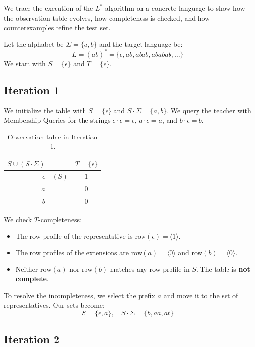We trace the execution of the $L^*$ algorithm on a concrete language to show how the observation table evolves, how completeness is checked, and how counterexamples refine the test set.

Let the alphabet be $\Sigma = \{a, b\}$ and the target language be:
\[
  L = (ab)^* = \{\epsilon, ab, abab, ababab, \dots\}
\]
We start with $S = \{\epsilon\}$ and $T = \{\epsilon\}$.

\subsection{Iteration 1}

We initialize the table with $S = \{\epsilon\}$ and $S \cdot \Sigma = \{a, b\}$. We query the teacher with Membership Queries for the strings $\epsilon \cdot \epsilon = \epsilon$, $a \cdot \epsilon = a$, and $b \cdot \epsilon = b$.

\begin{table}[H]
  \centering
  \begin{tabular}{rcc}
    \toprule
    $S \cup (S \cdot \Sigma)$ & & $T = \{\epsilon\}$ \\
    \midrule
    $\epsilon$ & $(S)$ & $1$ \\
    \midrule
    $a$ & & $0$ \\
    $b$ & & $0$ \\
    \bottomrule
  \end{tabular}
  \caption{Observation table in Iteration 1.}
  \label{tab:iter1}
\end{table}

We check $T$-completeness:
\begin{itemize}
  \item The row profile of the representative is $\text{row}(\epsilon) = \langle 1 \rangle$.
  \item The row profiles of the extensions are $\text{row}(a) = \langle 0 \rangle$ and $\text{row}(b) = \langle 0 \rangle$.
  \item Neither $\text{row}(a)$ nor $\text{row}(b)$ matches any row profile in $S$. The table is \textbf{not complete}.
\end{itemize}
To resolve the incompleteness, we select the prefix $a$ and move it to the set of representatives.
Our sets become:
\[
  S = \{\epsilon, a\}, \quad S \cdot \Sigma = \{b, aa, ab\}
\]

\subsection{Iteration 2}

